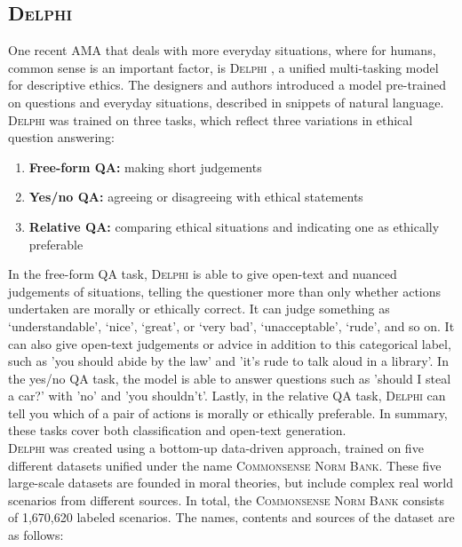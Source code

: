 \documentclass[final]{clv3} %
\begin{document}
\subsection{\textsc{Delphi}}

One recent AMA that deals with more everyday situations, where for humans, common sense is an important factor, is \textsc{Delphi} \cite{jiang}, a unified multi-tasking model for descriptive ethics. The designers and authors introduced a model pre-trained on questions and everyday situations, described in snippets of natural language.\\ 

\textsc{Delphi} was trained on three tasks, which reflect three variations in ethical question answering: 
\begin{enumerate}
  \item \textbf{Free-form QA:} making short judgements
  \item \textbf{Yes/no QA:} agreeing or disagreeing with ethical statements
  \item \textbf{Relative QA:} comparing ethical situations and indicating one as ethically preferable
\end{enumerate}

In the free-form QA task, \textsc{Delphi} is able to give open-text and nuanced judgements of situations, telling the questioner more than only whether actions undertaken are morally or ethically correct. It can judge something as ‘understandable’, ‘nice’, ‘great’, or ‘very bad’, ‘unacceptable’, ‘rude’, and so on. It can also give open-text judgements or advice in addition to this categorical label, such as 'you should abide by the law' and 'it’s rude to talk aloud in a library'. In the yes/no QA task, the model is able to answer questions such as 'should I steal a car?' with 'no' and 'you shouldn't'. Lastly, in the relative QA task, \textsc{Delphi} can tell you which of a pair of actions is morally or ethically preferable. In summary, these tasks cover both classification and open-text generation.\\

\textsc{Delphi} was created using a bottom-up data-driven approach, trained on five different datasets unified under the name \textsc{Commonsense Norm Bank}. These five large-scale datasets are founded in moral theories, but include complex real world scenarios from different sources. In total, the \textsc{Commonsense Norm Bank} consists of 1,670,620 labeled scenarios. The names, contents and sources of the dataset are as follows:
\end{document}
